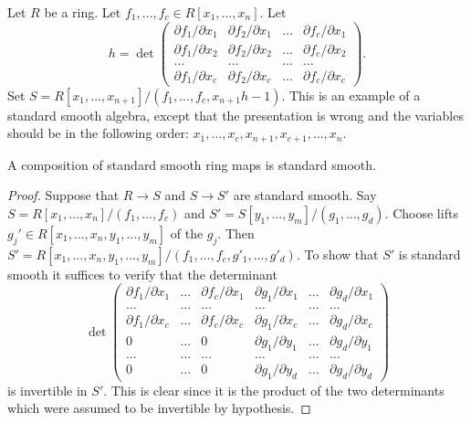 \begin{example}
\label{example-make-standard-smooth}
Let $R$ be a ring.
Let $f_1, \ldots, f_c \in R[x_1, \ldots, x_n]$.
Let
$$
h =
\det
\left(
\begin{matrix}
\partial f_1/\partial x_1 &
\partial f_2/\partial x_1 &
\ldots &
\partial f_c/\partial x_1 \\
\partial f_1/\partial x_2 &
\partial f_2/\partial x_2 &
\ldots &
\partial f_c/\partial x_2 \\
\ldots & \ldots & \ldots & \ldots \\
\partial f_1/\partial x_c &
\partial f_2/\partial x_c &
\ldots &
\partial f_c/\partial x_c
\end{matrix}
\right).
$$
Set $S = R[x_1, \ldots, x_{n + 1}]/(f_1, \ldots, f_c, x_{n + 1}h - 1)$.
This is an example of a standard smooth algebra, except that the
presentation is wrong and the variables should be in the
following order:
$x_1, \ldots, x_c, x_{n + 1}, x_{c + 1}, \ldots, x_n$.
\end{example}

\begin{lemma}
\label{lemma-compose-standard-smooth}
A composition of standard smooth ring maps is standard smooth.
\end{lemma}

\begin{proof}
Suppose that $R \to S$ and $S \to S'$ are standard smooth. Say
$S =  R[x_1, \ldots, x_n]/(f_1, \ldots, f_c)$
and
$S' = S[y_1, \ldots, y_m]/(g_1, \ldots, g_d)$.
Choose lifts $g_j' \in R[x_1, \ldots, x_n, y_1, \ldots, y_m]$ of the $g_j$.
Then
$S' = R[x_1, \ldots, x_n, y_1, \ldots, y_m]/
(f_1, \ldots, f_c, g'_1, \ldots, g'_d)$.
To show that $S'$ is standard smooth it suffices to verify
that the determinant
$$
\det
\left(
\begin{matrix}
\partial f_1/\partial x_1 &
\ldots &
\partial f_c/\partial x_1 &
\partial g_1/\partial x_1 &
\ldots &
\partial g_d/\partial x_1 \\
\ldots &
\ldots &
\ldots &
\ldots &
\ldots &
\ldots  \\
\partial f_1/\partial x_c &
\ldots &
\partial f_c/\partial x_c &
\partial g_1/\partial x_c &
\ldots &
\partial g_d/\partial x_c \\
0 &
\ldots &
0 &
\partial g_1/\partial y_1 &
\ldots &
\partial g_d/\partial y_1 \\
\ldots &
\ldots &
\ldots &
\ldots &
\ldots &
\ldots  \\
0 &
\ldots &
0 &
\partial g_1/\partial y_d &
\ldots &
\partial g_d/\partial y_d
\end{matrix}
\right)
$$
is invertible in $S'$. This is clear since it is the product
of the two determinants which were assumed to be invertible
by hypothesis.
\end{proof}


